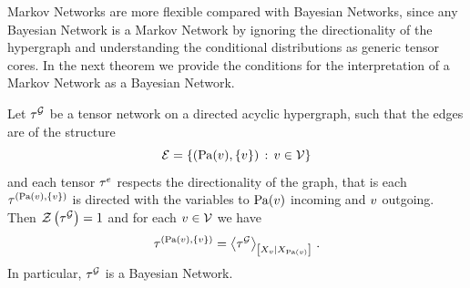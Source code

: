 
Markov Networks are more flexible compared with Bayesian Networks, since any Bayesian Network is a Markov Network by ignoring the directionality of the hypergraph and understanding the conditional distributions as generic tensor cores.
In the next theorem we provide the conditions for the interpretation of a Markov Network as a Bayesian Network.

\begin{theorem}
    \label{the:MarkovToBayesian}
    Let $\tau^{\mathcal{G}}$ be a tensor network on a directed acyclic hypergraph, such that the edges are of the structure
    \[ \mathcal{E} = \{(\mathrm{Pa}(v),\{v\}) \,:\, v\in\mathcal{V}\} \]
    and each tensor $\tau^{e}$ respects the directionality of the graph, that is each $\tau^{(\mathrm{Pa}(v), \{v\})}$ is directed with the variables to $\mathrm{Pa}(v)$ incoming and $v$ outgoing.
    Then $\mathcal{Z}\left(\tau^{\mathcal{G}}\right)=1$ and for each $v\in\mathcal{V}$ we have
    \[ \tau^{(\mathrm{Pa}(v),\{v\})} = \left\langle \tau^{\mathcal{G}}\right\rangle_{\left[ X_{v} | X_{\mathrm{Pa}(v)} \right]} \, . \]
    In particular, $\tau^{\mathcal{G}}$ is a Bayesian Network.
\end{theorem}
